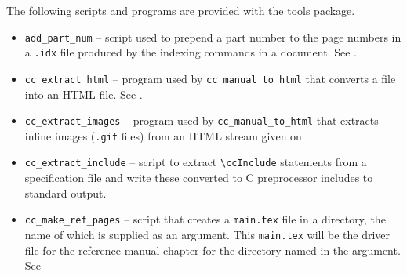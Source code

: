 The following scripts and programs are provided with the tools package.

\begin{itemize}
   \item \verb|add_part_num|%
         -- script used to prepend a part number to the 
         page numbers in a {\tt .idx} file produced by the indexing commands in
         a  document.  
         See .
   \item {} 
         \verb|cc_extract_html|%
          -- program used by {\tt cc\_manual\_to\_html}
         that converts a  file into an HTML file.
         See .
   \item \verb|cc_extract_images|%
         -- program used by {\tt cc\_manual\_to\_html}
         that extracts inline images
         ({\tt .gif} files) from an HTML stream given on .
   \item \verb|cc_extract_include|%
         -- script to extract \verb|\ccInclude|
         statements from a specification file and write these converted to
         C preprocessor includes to standard output.  
   \item \verb|cc_make_ref_pages|
         -- script that creates a
                  {{\tt main.tex}}%
         file in a directory, the name of which is supplied as an argument.  
         This {\tt main.tex} will be the driver file for the reference manual 
         chapter for the directory named in the argument. See 

\end{itemize}
